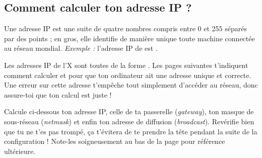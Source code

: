 \subsection{Comment calculer ton adresse IP ?}

\label{calcul_ip}

Une adresse IP est une suite de quatre nombres compris entre 0 et
255 s\'epar\'es par des points ; en gros, elle identifie de mani\`ere
unique toute machine connect\'ee au r\'eseau mondial. \emph{Exemple :}
l'adresse IP de \fkz est .

Les adresses IP de l'X sont toutes de la forme .
Les pages suivantes t'indiquent comment calculer  et  pour que ton
ordinateur ait une adresse unique et correcte. Une erreur sur cette adresse t'emp\^eche tout simplement d'acc\'eder au r\'eseau, donc assure-toi que ton calcul est juste !

Calcule ci-dessous ton adresse IP, celle de ta passerelle (\emph{gateway}), ton masque de sous-r\'eseau
(\emph{netmask}) et enfin ton adresse de diffusion (\emph{broadcast}).
Rev\'erifie bien que tu ne t'es pas tromp\'e,  \c{c}a t'\'evitera de te prendre la t\^ete pendant la suite de la configuration !
Note-les soigneusement au bas de la page \pageref{tableauIp} pour référence ultérieure.

